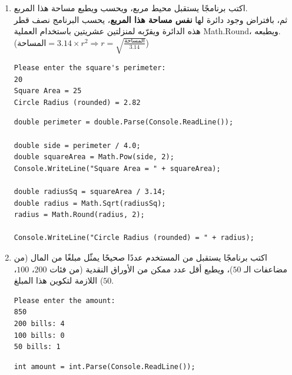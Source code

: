 \documentclass[14pt]{extarticle}
\begin{document}
\begin{enumerate}[itemsep=2em]
\item
اكتب برنامجًا يستقبل محيط مربع، ويحسب ويطبع مساحة هذا المربع. \\
ثم، بافتراض وجود دائرة لها \textbf{نفس مساحة هذا المربع}، يحسب البرنامج نصف قطر هذه الدائرة ويقرّبه لمنزلتين عشريتين باستخدام العملية \textenglish{Math.Round}، ويطبعه. \\
($\text{المساحة} = 3.14 \times r^2 \Rightarrow r = \sqrt{\frac{\text{المساحة}}{3.14}}$)
\ifdetailed
\begin{boxExample}
\begin{english}
\begin{verbatim}
Please enter the square's perimeter:
20
Square Area = 25
Circle Radius (rounded) = 2.82
\end{verbatim}
\end{english}
\end{boxExample}
\fi
\ifwithsols
\begin{boxSolution}
\begin{english}
\begin{verbatim}
double perimeter = double.Parse(Console.ReadLine());

double side = perimeter / 4.0;
double squareArea = Math.Pow(side, 2);
Console.WriteLine("Square Area = " + squareArea);

double radiusSq = squareArea / 3.14;
double radius = Math.Sqrt(radiusSq);
radius = Math.Round(radius, 2);

Console.WriteLine("Circle Radius (rounded) = " + radius);
\end{verbatim}
\end{english}
\end{boxSolution}
\fi
\filbreak

\item
اكتب برنامجًا يستقبل من المستخدم عددًا صحيحًا يمثّل مبلغًا من المال (من مضاعفات الـ $50$)، ويطبع أقل عدد ممكن من الأوراق النقدية (من فئات $200$، $100$، $50$) اللازمة لتكوين هذا المبلغ.
\ifdetailed
\begin{boxExample}
\begin{english}
\begin{verbatim}
Please enter the amount:
850
200 bills: 4
100 bills: 0
50 bills: 1
\end{verbatim}
\end{english}
\end{boxExample}
\fi
\ifwithsols
\begin{boxSolution}
\begin{english}
\begin{verbatim}
int amount = int.Parse(Console.ReadLine());


\end{verbatim}
\end{english}
\end{boxSolution}
\end{enumerate}
\end{document}
